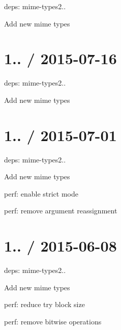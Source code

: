 \begin{DoxyItemize}
\item deps\+: mime-\/types2..
\begin{DoxyItemize}
\item Add new mime types
\end{DoxyItemize}
\end{DoxyItemize}

\section*{1.. / 2015-\/07-\/16 }


\begin{DoxyItemize}
\item deps\+: mime-\/types2..
\begin{DoxyItemize}
\item Add new mime types
\end{DoxyItemize}
\end{DoxyItemize}

\section*{1.. / 2015-\/07-\/01 }


\begin{DoxyItemize}
\item deps\+: mime-\/types2..
\begin{DoxyItemize}
\item Add new mime types
\end{DoxyItemize}
\item perf\+: enable strict mode
\item perf\+: remove argument reassignment
\end{DoxyItemize}

\section*{1.. / 2015-\/06-\/08 }


\begin{DoxyItemize}
\item deps\+: mime-\/types2..
\begin{DoxyItemize}
\item Add new mime types
\end{DoxyItemize}
\item perf\+: reduce try block size
\item perf\+: remove bitwise operations
\end{DoxyItemize}

